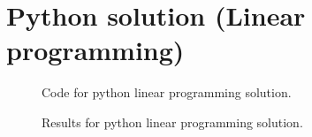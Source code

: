 \documentclass[a4paper,oneside,11pt]{book}
\begin{document}
\section{Python solution (Linear programming)}
\begin{figure}[H]
    \centering
    \caption{Code for python linear programming solution.}
\end{figure}
\begin{figure}[H]
    \centering
    \caption{Results for python linear programming solution.}
\end{figure}
\end{document}
